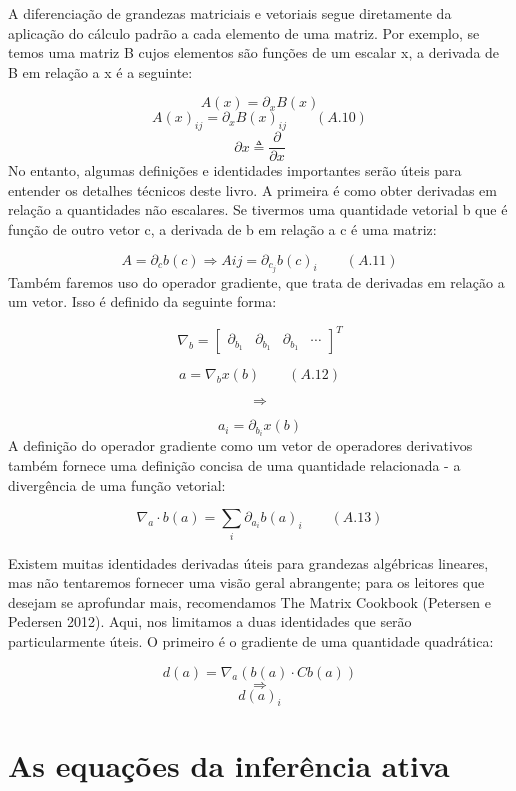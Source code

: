 \documentclass[
  12pt,
]{book}
\begin{document}
A diferenciação de grandezas matriciais e vetoriais segue diretamente da aplicação do cálculo padrão a cada elemento de uma matriz. Por exemplo, se temos uma matriz B cujos elementos são funções de um escalar x, a derivada de B em relação a x é a seguinte:

\[ A(x) = \partial_x B(x)  \]
\[ A(x)_{ij} = \partial_x B(x)_{ij} \qquad (A.10)\]
\[ \partial x \triangleq  \frac {\partial} {\partial x} \]
No entanto, algumas definições e identidades importantes serão úteis para entender os detalhes técnicos deste livro. A primeira é como obter derivadas em relação a quantidades não escalares. Se tivermos uma quantidade vetorial b que é função de outro vetor c, a derivada de b em relação a c é uma matriz:

\[ A = \partial_c b(c) \Longrightarrow A{ij} = \partial_{c_j}b(c)_i  \qquad (A.11)\]
Também faremos uso do operador gradiente, que trata de derivadas em relação a um vetor. Isso é definido da seguinte forma:

\[ \nabla_b = \begin{bmatrix} 
\partial_{b_1} &  \partial_{b_1} & \partial_{b_1} & \cdots 
\end{bmatrix}^T  \]

\[ a = \nabla_bx(b) \qquad (A.12)\]

\[ \Longrightarrow \]

\[ a_i = \partial_{b_i}x(b)\]
A definição do operador gradiente como um vetor de operadores derivativos também fornece uma definição concisa de uma quantidade relacionada - a divergência de uma função vetorial:

\[ \nabla_a \cdot b(a) = \sum_i \partial_{a_i}b(a)_i \qquad (A.13)\]

Existem muitas identidades derivadas úteis para grandezas algébricas lineares, mas não tentaremos fornecer uma visão geral abrangente; para os leitores que desejam se aprofundar mais, recomendamos The Matrix Cookbook (Petersen e Pedersen 2012). Aqui, nos limitamos a duas identidades que serão particularmente úteis. O primeiro é o gradiente de uma quantidade quadrática:

\[ d(a) = \nabla_a(b(a) \cdot Cb(a))\]
\[ \Longrightarrow\]
\[d(a)_i\]

\hypertarget{as-equauxe7uxf5es-da-inferuxeancia-ativa}{%
\chapter{As equações da inferência ativa}\label{as-equauxe7uxf5es-da-inferuxeancia-ativa}}
\end{document}
